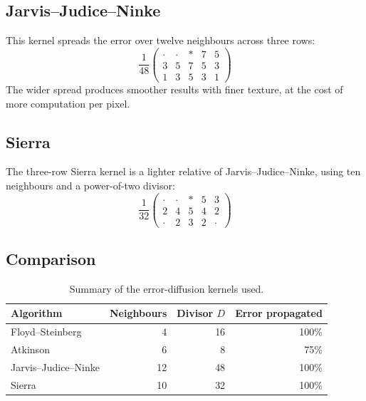 \documentclass[11pt,a4paper]{article}
\begin{document}
\subsection{Jarvis--Judice--Ninke}
\label{sec:jarvis}

This kernel spreads the error over twelve neighbours across three rows:
\begin{equation}
  \frac{1}{48}
  \begin{pmatrix}
    \cdot & \cdot & \ast & 7 & 5 \\
    3 & 5 & 7 & 5 & 3 \\
    1 & 3 & 5 & 3 & 1
  \end{pmatrix}
\end{equation}
The wider spread produces smoother results with finer texture, at the cost of
more computation per pixel.

\subsection{Sierra}
\label{sec:sierra}

The three-row Sierra kernel is a lighter relative of Jarvis--Judice--Ninke,
using ten neighbours and a power-of-two divisor:
\begin{equation}
  \frac{1}{32}
  \begin{pmatrix}
    \cdot & \cdot & \ast & 5 & 3 \\
    2 & 4 & 5 & 4 & 2 \\
    \cdot & 2 & 3 & 2 & \cdot
  \end{pmatrix}
\end{equation}

\subsection{Comparison}

\begin{table}[htbp]
  \centering
  \caption{Summary of the error-diffusion kernels used.}
  \label{tab:kernels}
  \begin{tabular}{lrrr}
    \toprule
    Algorithm & Neighbours & Divisor $D$ & Error propagated \\
    \midrule
    Floyd--Steinberg        & 4  & 16 & 100\% \\
    Atkinson                & 6  & 8  & 75\%  \\
    Jarvis--Judice--Ninke   & 12 & 48 & 100\% \\
    Sierra                  & 10 & 32 & 100\% \\
    \bottomrule
  \end{tabular}
\end{table}
\end{document}
